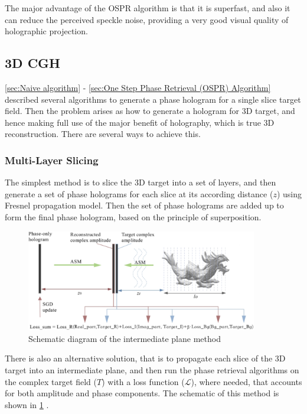 The major advantage of the OSPR algorithm is that it is superfast, and also it can reduce the perceived speckle noise, providing a very good visual quality of holographic projection.


\subsection{3D CGH}
\cref{sec:Naive algorithm} - \cref{sec:One Step Phase Retrieval (OSPR) Algorithm} described several algorithms to generate a phase hologram for a single slice target field. Then the problem arises as how to generate a hologram for 3D target, and hence making full use of the major benefit of holography, which is true 3D reconstruction. There are several ways to achieve this.

\subsubsection{Multi-Layer Slicing}
The simplest method is to slice the 3D target into a set of layers, and then generate a set of phase holograms for each slice at its according distance ($z$) using Fresnel propagation model. Then the set of phase holograms are added up to form the final phase hologram, based on the principle of superposition.

\begin{figure}[H]
  \centering
  \includegraphics[width=0.9\textwidth]{intermediate_plane.png}
  \caption{Schematic diagram of the intermediate plane method \cite{Chen2021}}
  \label{fig:intermediate_plane}
\end{figure}

There is also an alternative solution, that is to propagate each slice of the 3D target into an intermediate plane, and then run the phase retrieval algorithms on the complex target field ($T$) with a loss function ($\mathcal{L} $), where needed, that accounts for both amplitude and phase components. The schematic of this method is shown in \cref{fig:intermediate_plane} \cite{Chen2021}.


